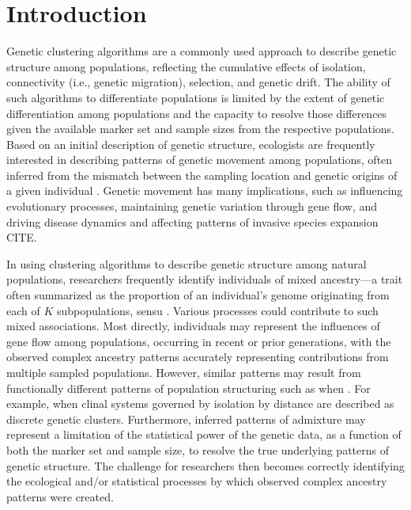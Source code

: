 
\section*{Introduction}

Genetic clustering algorithms are a commonly used approach to describe genetic structure among populations, reflecting the cumulative effects of isolation, connectivity (i.e., genetic migration), selection, and genetic drift.  The ability of such algorithms to differentiate populations is limited by the extent of genetic differentiation among populations and the capacity to resolve those differences given the available marker set and sample sizes from the respective populations.  Based on an initial description of genetic structure, ecologists are frequently interested in describing patterns of genetic movement among populations, often inferred from the mismatch between the sampling location and genetic origins of a given individual \citep{paetkau1995microsatellite,wilson2003bayesian}.  Genetic movement has many implications, such as influencing evolutionary processes, maintaining genetic variation through gene flow, and driving disease dynamics \citep{huestis2019windborne} and affecting patterns of invasive species expansion CITE.

	In using clustering algorithms to describe genetic structure among natural populations, researchers frequently identify individuals of mixed ancestry---a trait often summarized as the proportion of an individual’s genome originating from each of $K$ subpopulations, sensu \citet{pritchard2000inference}.  Various processes could contribute to such mixed associations.  Most directly, individuals may represent the influences of gene flow among populations, occurring in recent or prior generations, with the observed complex ancestry patterns accurately representing contributions from multiple sampled populations.  However, similar patterns may result from functionally different patterns of population structuring such as when . For example, when clinal systems governed by isolation by distance are described as discrete genetic clusters. Furthermore, inferred patterns of admixture may represent a limitation of the statistical power of the genetic data, as a function of both the marker set and sample size, to resolve the true underlying patterns of genetic structure.  The challenge for researchers then becomes correctly identifying the ecological and/or statistical processes by which observed complex ancestry patterns were created.

